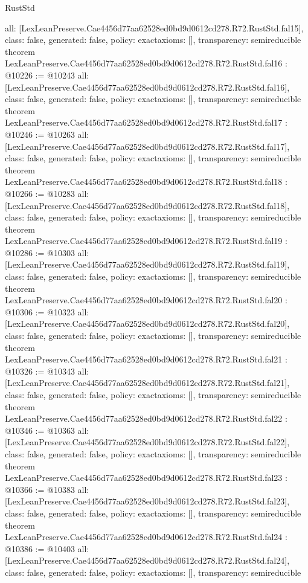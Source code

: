 \begin{lexlean}{RustStd}
\begin{coremodule}
{  all: [LexLeanPreserve.Cae4456d77aa62528ed0bd9d0612cd278.R72.RustStd.fal15],
  class: false,
  generated: false,
  policy: exact{axioms: []},
  transparency: semireducible
}
theorem LexLeanPreserve.Cae4456d77aa62528ed0bd9d0612cd278.R72.RustStd.fal16 : @10226 := @10243 {
  all: [LexLeanPreserve.Cae4456d77aa62528ed0bd9d0612cd278.R72.RustStd.fal16],
  class: false,
  generated: false,
  policy: exact{axioms: []},
  transparency: semireducible
}
theorem LexLeanPreserve.Cae4456d77aa62528ed0bd9d0612cd278.R72.RustStd.fal17 : @10246 := @10263 {
  all: [LexLeanPreserve.Cae4456d77aa62528ed0bd9d0612cd278.R72.RustStd.fal17],
  class: false,
  generated: false,
  policy: exact{axioms: []},
  transparency: semireducible
}
theorem LexLeanPreserve.Cae4456d77aa62528ed0bd9d0612cd278.R72.RustStd.fal18 : @10266 := @10283 {
  all: [LexLeanPreserve.Cae4456d77aa62528ed0bd9d0612cd278.R72.RustStd.fal18],
  class: false,
  generated: false,
  policy: exact{axioms: []},
  transparency: semireducible
}
theorem LexLeanPreserve.Cae4456d77aa62528ed0bd9d0612cd278.R72.RustStd.fal19 : @10286 := @10303 {
  all: [LexLeanPreserve.Cae4456d77aa62528ed0bd9d0612cd278.R72.RustStd.fal19],
  class: false,
  generated: false,
  policy: exact{axioms: []},
  transparency: semireducible
}
theorem LexLeanPreserve.Cae4456d77aa62528ed0bd9d0612cd278.R72.RustStd.fal20 : @10306 := @10323 {
  all: [LexLeanPreserve.Cae4456d77aa62528ed0bd9d0612cd278.R72.RustStd.fal20],
  class: false,
  generated: false,
  policy: exact{axioms: []},
  transparency: semireducible
}
theorem LexLeanPreserve.Cae4456d77aa62528ed0bd9d0612cd278.R72.RustStd.fal21 : @10326 := @10343 {
  all: [LexLeanPreserve.Cae4456d77aa62528ed0bd9d0612cd278.R72.RustStd.fal21],
  class: false,
  generated: false,
  policy: exact{axioms: []},
  transparency: semireducible
}
theorem LexLeanPreserve.Cae4456d77aa62528ed0bd9d0612cd278.R72.RustStd.fal22 : @10346 := @10363 {
  all: [LexLeanPreserve.Cae4456d77aa62528ed0bd9d0612cd278.R72.RustStd.fal22],
  class: false,
  generated: false,
  policy: exact{axioms: []},
  transparency: semireducible
}
theorem LexLeanPreserve.Cae4456d77aa62528ed0bd9d0612cd278.R72.RustStd.fal23 : @10366 := @10383 {
  all: [LexLeanPreserve.Cae4456d77aa62528ed0bd9d0612cd278.R72.RustStd.fal23],
  class: false,
  generated: false,
  policy: exact{axioms: []},
  transparency: semireducible
}
theorem LexLeanPreserve.Cae4456d77aa62528ed0bd9d0612cd278.R72.RustStd.fal24 : @10386 := @10403 {
  all: [LexLeanPreserve.Cae4456d77aa62528ed0bd9d0612cd278.R72.RustStd.fal24],
  class: false,
  generated: false,
  policy: exact{axioms: []},
  transparency: semireducible
}
\end{coremodule}
\end{lexlean}
